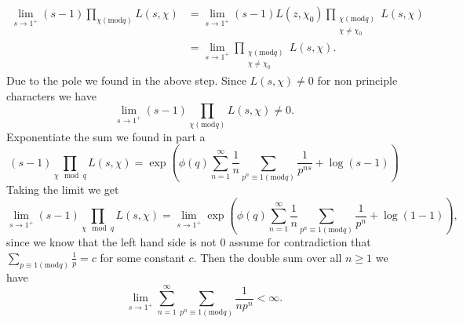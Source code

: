 \documentclass[12pt]{article}
\begin{document}
\begin{enumerate}[label=(\alph*)]
    \begin{align*}
        \lim_{s\to1^{+}}(s-1)\prod_{\chi(\text{mod}q)}L(s,\chi)&=\lim_{s\to1^{+}}(s-1)L(z,\chi_0)\prod_{\substack{\chi(\text{mod}q)\\\chi\neq\chi_0}}L(s,\chi)\\
        &=\lim_{s\to1^{+}}\prod_{\substack{\chi(\text{mod}q)\\\chi\neq\chi_0}}L(s,\chi).
    \end{align*}
    Due to the pole we found in the above step. Since $L(s,\chi)\neq0$ for non principle characters we have
    \[
        \lim_{s\to1^{+}}(s-1)\prod_{\chi(\text{mod}q)}L(s,\chi)\neq0.
    \]
    Exponentiate the sum we found in part a 
    \[
        (s-1)\prod_{\chi\mod q}L(s,\chi)=\exp\left(\phi(q)\sum_{n=1}^\infty\frac{1}{n}\sum_{p^n\equiv 1(\text{mod} q)}\frac{1}{p^{ns}}+\log(s-1)\right)
    \]
    Taking the limit we get
    \[
        \lim_{s\to1^{+}}(s-1)\prod_{\chi\mod q}L(s,\chi)=\lim_{s\to1^{+}}\exp\left(\phi(q)\sum_{n=1}^\infty\frac{1}{n}\sum_{p^n\equiv 1(\text{mod} q)}\frac{1}{p^{n}}+\log(1-1)\right),
    \]
    since we know that the left hand side is not 0 assume for contradiction that $\sum_{p\equiv 1(\text{mod} q)}\frac{1}{p}=c$ for some constant $c$. Then the double sum over all $n\geq1$ we have
    \[
        \lim_{s\to1^{+}}\sum_{n=1}^\infty\sum_{p^n\equiv 1(\text{mod} q)}\frac{1}{np^{n}}<\infty.
    \]


\end{enumerate}
\end{document}
